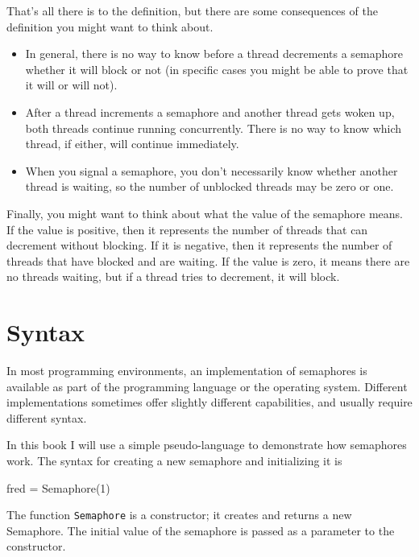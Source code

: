 \documentclass{book}
\begin{document}
That's all there is to the definition, but there are some
consequences of the definition you might want to think about.

\begin{itemize}

    \item In general, there is no way to know before a thread decrements a
          semaphore whether it will block or not (in specific cases you might
          be able to prove that it will or will not).

    \item After a thread increments a semaphore and another thread gets
          woken up, both threads continue running concurrently.  There is no way
          to know which thread, if either, will continue immediately.

    \item When you signal a semaphore, you don't necessarily know whether
          another thread is waiting, so the number of unblocked threads may
          be zero or one.

\end{itemize}

Finally, you might want to think about what the value of the
semaphore means.  If the value is positive, then it represents the
number of threads that can decrement without blocking.  If it
is negative, then it represents the number of threads that have
blocked and are waiting.  If the value is zero, it means there
are no threads waiting, but if a thread tries to decrement, it
will block.


\section{Syntax}

In most programming environments, an implementation of semaphores is
available as part of the programming language or the operating system.
Different implementations sometimes offer slightly different
capabilities, and usually require different syntax.

In this book I will use a simple pseudo-language to demonstrate
how semaphores work.  The syntax for creating a new semaphore
and initializing it is

\begin{unbreakable}[title={Semaphore initialization syntax}]{}
fred = Semaphore(1)
\end{unbreakable}

The function {\tt Semaphore} is a constructor; it creates and
returns a new Semaphore.  The initial value of the semaphore
is passed as a parameter to the constructor.
\end{document}
